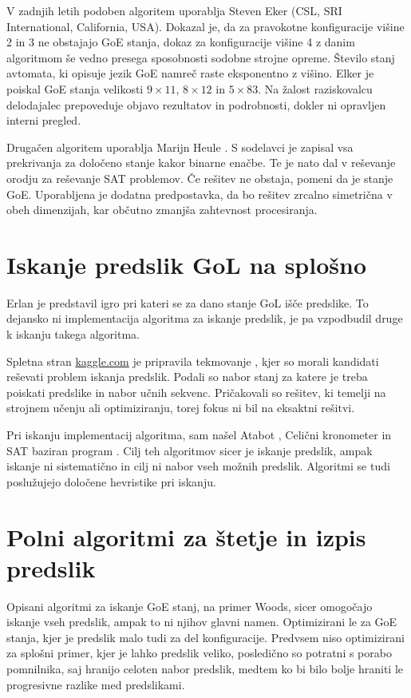 \documentclass[12pt,a4paper,openany,twoside]{book}
\begin{document}
V zadnjih letih podoben algoritem uporablja Steven Eker (CSL, SRI International, California, USA).
Dokazal je, da za pravokotne konfiguracije višine 2 in 3 ne obstajajo GoE stanja,
dokaz za konfiguracije višine 4 z danim algoritmom še vedno presega sposobnosti sodobne strojne opreme.
Število stanj avtomata, ki opisuje jezik GoE namreč raste eksponentno z višino.
Elker je poiskal GoE stanja velikosti \(9 \times 11\), \(8 \times 12\) in \(5 \times 83\).
Na žalost raziskovalcu delodajalec prepoveduje objavo rezultatov in podrobnosti, dokler ni opravljen interni pregled.

Drugačen algoritem uporablja Marijn Heule \cite{Hartman2013}.
S sodelavci je zapisal vsa prekrivanja za določeno stanje kakor binarne enačbe.
Te je nato dal v reševanje orodju za reševanje SAT problemov.
Če rešitev ne obstaja, pomeni da je stanje GoE.
Uporabljena je dodatna predpostavka, da bo rešitev zrcalno simetrična v obeh dimenzijah,
kar občutno zmanjša zahtevnost procesiranja.

\section{Iskanje predslik GoL na splošno}

Erlan \cite{Erlan2012} je predstavil igro pri kateri se za dano stanje
GoL išče predslike. To dejansko ni implementacija algoritma za iskanje predslik,
je pa vzpodbudil druge k iskanju takega algoritma.

Spletna stran \url{kaggle.com} je pripravila tekmovanje \cite{kaggle2013},
kjer so morali kandidati reševati problem iskanja predslik. Podali so
nabor stanj za katere je treba poiskati predslike in nabor učnih sekvenc.
Pričakovali so rešitev, ki temelji na strojnem učenju ali optimiziranju,
torej fokus ni bil na eksaktni rešitvi.

Pri iskanju implementacij algoritma, sam našel Atabot \cite{Borah2013},
Celični kronometer \cite{Duxbury2013} in SAT baziran program \cite{Pigorsch2015}.
Cilj teh algoritmov sicer je iskanje predslik, ampak iskanje ni sistematično
in cilj ni nabor vseh možnih predslik.
Algoritmi se tudi poslužujejo določene hevristike pri iskanju.

\section{Polni algoritmi za štetje in izpis predslik}

Opisani algoritmi za iskanje GoE stanj, na primer Woods,
sicer omogočajo iskanje vseh predslik, ampak to ni njihov glavni namen.
Optimizirani le za GoE stanja, kjer je predslik malo tudi za del konfiguracije.
Predvsem niso optimizirani za splošni primer, kjer je lahko predslik veliko,
posledično so potratni s porabo pomnilnika, saj hranijo celoten nabor predslik,
medtem ko bi bilo bolje hraniti le progresivne razlike med predslikami.
\end{document}
